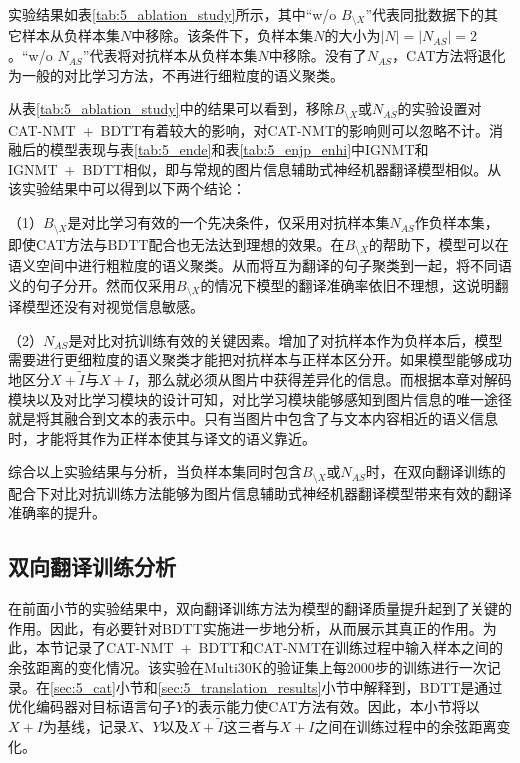 实验结果如表\ref{tab:5_ablation_study}所示，其中“w/o $B_{\setminus X}$”代表同批数据下的其它样本从负样本集$N$中移除。该条件下，负样本集$N$的大小为$|N|=|N_{AS}|=2$。“w/o $N_{AS}$”代表将对抗样本从负样本集$N$中移除。没有了$N_{AS}$，CAT方法将退化为一般的对比学习方法，不再进行细粒度的语义聚类。

从表\ref{tab:5_ablation_study}中的结果可以看到，移除$B_{\setminus X}$或$N_{AS}$的实验设置对CAT-NMT~+~BDTT有着较大的影响，对CAT-NMT的影响则可以忽略不计。消融后的模型表现与表\ref{tab:5_ende}和表\ref{tab:5_enjp_enhi}中IGNMT和IGNMT~+~BDTT相似，即与常规的图片信息辅助式神经机器翻译模型相似。从该实验结果中可以得到以下两个结论：

（1）$B_{\setminus X}$是对比学习有效的一个先决条件，仅采用对抗样本集$N_{AS}$作负样本集，即使CAT方法与BDTT配合也无法达到理想的效果。在$B_{\setminus X}$的帮助下，模型可以在语义空间中进行粗粒度的语义聚类。从而将互为翻译的句子聚类到一起，将不同语义的句子分开。然而仅采用$B_{\setminus X}$的情况下模型的翻译准确率依旧不理想，这说明翻译模型还没有对视觉信息敏感。

（2）$N_{AS}$是对比对抗训练有效的关键因素。增加了对抗样本作为负样本后，模型需要进行更细粒度的语义聚类才能把对抗样本与正样本区分开。如果模型能够成功地区分$X+\tilde{I}$与$X+I$，那么就必须从图片中获得差异化的信息。而根据本章对解码模块以及对比学习模块的设计可知，对比学习模块能够感知到图片信息的唯一途径就是将其融合到文本的表示中。只有当图片中包含了与文本内容相近的语义信息时，才能将其作为正样本使其与译文的语义靠近。

综合以上实验结果与分析，当负样本集同时包含$B_{\setminus X}$或$N_{AS}$时，在双向翻译训练的配合下对比对抗训练方法能够为图片信息辅助式神经机器翻译模型带来有效的翻译准确率的提升。

\subsection{双向翻译训练分析}
\label{sec:5_bdtt_analysis}

在前面小节的实验结果中，双向翻译训练方法为模型的翻译质量提升起到了关键的作用。因此，有必要针对BDTT实施进一步地分析，从而展示其真正的作用。为此，本节记录了CAT-NMT~+~BDTT和CAT-NMT在训练过程中输入样本之间的余弦距离的变化情况。该实验在Multi30K的验证集上每2000步的训练进行一次记录。在\ref{sec:5_cat}小节和\ref{sec:5_translation_results}小节中解释到，BDTT是通过优化编码器对目标语言句子$Y$的表示能力使CAT方法有效。因此，本小节将以$X+I$为基线，记录$X$、$Y$以及$X+\tilde{I}$这三者与$X+I$之间在训练过程中的余弦距离变化。


